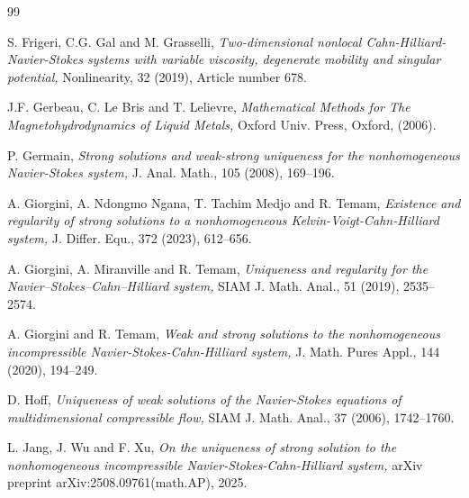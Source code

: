 \documentclass[11pt]{article}
\numberwithin{equation}{section}
\begin{document}
\begin{center}
\begin{thebibliography}{99}

S. Frigeri, C.G. Gal and M. Grasselli, {\it Two-dimensional nonlocal Cahn-Hilliard-Navier-Stokes systems with variable viscosity, degenerate mobility and singular potential,} Nonlinearity,  32 (2019), Article number 678.


 J.F. Gerbeau, C. Le Bris and T. Lelievre, {\it Mathematical Methods for The Magnetohydrodynamics of Liquid Metals,} Oxford Univ. Press, Oxford, (2006).

 P. Germain, {\it Strong solutions and weak-strong uniqueness for the nonhomogeneous Navier-Stokes system,} J. Anal. Math., 105 (2008), 169--196.

 A. Giorgini,  A. Ndongmo Ngana, T. Tachim Medjo  and  R. Temam, {\it  Existence and regularity of strong solutions to a nonhomogeneous Kelvin-Voigt-Cahn-Hilliard system,} J. Differ. Equ., 372 (2023), 612--656.


A. Giorgini, A. Miranville and R. Temam, {\it Uniqueness and regularity for the Navier--Stokes--Cahn--Hilliard system,} SIAM J. Math. Anal., 51 (2019), 2535--2574.

A. Giorgini and R. Temam, {\it Weak and strong solutions to the nonhomogeneous incompressible Navier-Stokes-Cahn-Hilliard system,} J. Math. Pures Appl., 144 (2020), 194--249.


 D. Hoff, {\it Uniqueness of weak solutions of the Navier-Stokes equations of multidimensional compressible flow,} SIAM J. Math. Anal., 37 (2006), 1742--1760.


 L. Jang, J. Wu and F. Xu, {\it On the uniqueness of strong solution to the nonhomogeneous incompressible Navier-Stokes-Cahn-Hilliard system,} arXiv preprint arXiv:2508.09761(math.AP), 2025.



\end{thebibliography}
\end{center}
\end{document}
